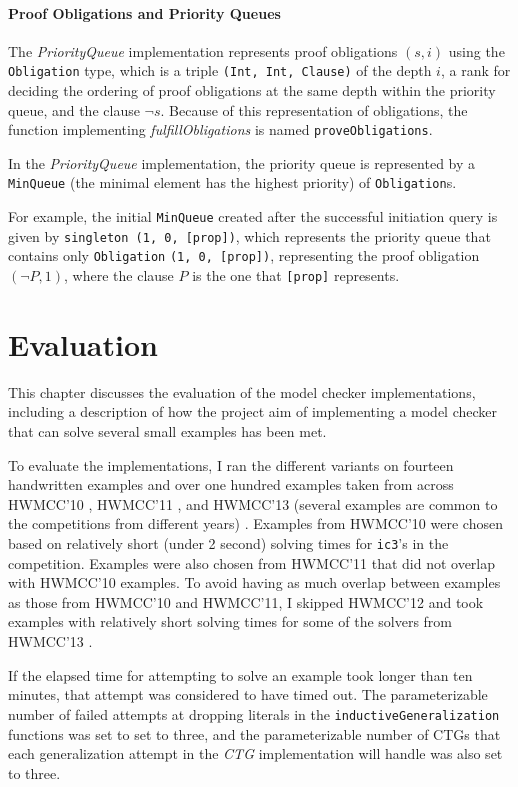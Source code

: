 \documentclass[12pt,a4paper,twoside,openright]{report}
\begin{document}
{\subsubsection{Proof Obligations and Priority Queues}

The {\it PriorityQueue} implementation represents proof obligations $(s,i)$ using the
\verb,Obligation, type, which is a triple \verb.(Int, Int, Clause). of the depth $i$, a
rank for deciding the ordering of proof obligations at the same depth within the priority
queue, and the clause $\neg s$. Because of this representation of obligations, the
function implementing {\it fulfillObligations} is named \verb,proveObligations,.

In the \emph{PriorityQueue} implementation, the priority queue is represented by
a \verb,MinQueue, (the minimal element has the highest
priority) of \verb,Obligation,s.

For example, the initial \verb,MinQueue, created after the successful initiation query
is given by \verb.singleton (1, 0, [prop])., which represents the priority queue that
contains only \verb,Obligation, \verb.(1, 0, [prop])., representing the proof obligation
$(\neg P,1)$, where the clause $P$ is the one that \verb,[prop], represents.

\chapter{Evaluation}
\label{eval}

This chapter discusses the evaluation of the model checker implementations,
including a description of how the project aim of implementing a model checker
that can solve several small examples has been met.

To evaluate the implementations, I ran the different variants
on fourteen handwritten examples and over one hundred examples taken from
across HWMCC'10 \cite{hwmcc10}, HWMCC'11 \cite{hwmcc11}, and HWMCC'13
(several examples are common to the competitions from different years) \cite{hwmcc13}.
Examples from HWMCC'10 were chosen based on relatively short (under 2 second)
solving times for \verb,ic3,'s in the competition.
Examples were also chosen from HWMCC'11 that did not overlap with HWMCC'10 examples.
To avoid having as much overlap between examples as those from HWMCC'10 and HWMCC'11,
I skipped HWMCC'12 and took examples
with relatively short solving times for some of the solvers from HWMCC'13
\cite{hwmcc13}.

If the elapsed time for attempting to solve an example took longer than ten minutes, that
attempt was considered to have timed out. The parameterizable number of failed attempts
at dropping literals in the \verb,inductiveGeneralization, functions was set to set to
three, and the parameterizable number of CTGs that each generalization attempt
in the {\it CTG} implementation will handle was also set to three.

}
\end{document}
